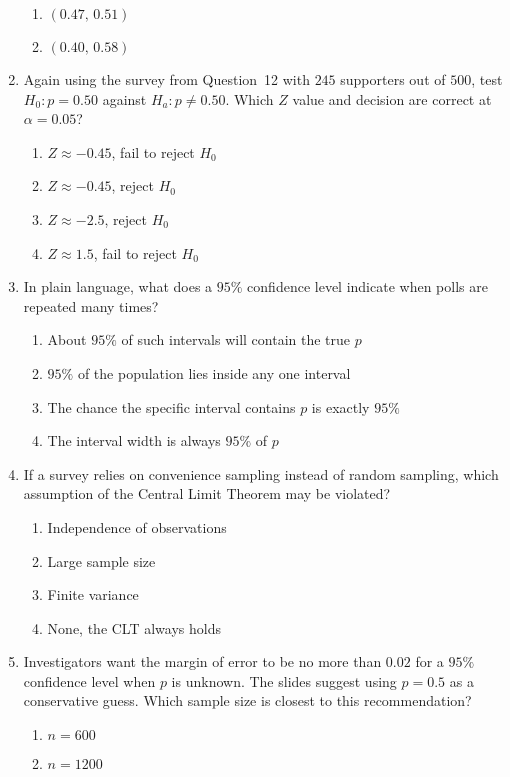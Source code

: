 \documentclass{article}
\begin{document}
\begin{enumerate}
\begin{enumerate}[label=(\Alph*)]
  \item $(0.47,\,0.51)$
  \item $(0.40,\,0.58)$
  \end{enumerate}
\item Again using the survey from Question~12 with $245$ supporters out of $500$, test $H_0:p=0.50$ against $H_a:p\ne0.50$. Which $Z$ value and decision are correct at $\alpha=0.05$?
  \begin{enumerate}[label=(\Alph*)]
  \item $Z\approx-0.45$, fail to reject $H_0$
  \item $Z\approx-0.45$, reject $H_0$
  \item $Z\approx-2.5$, reject $H_0$
  \item $Z\approx1.5$, fail to reject $H_0$
  \end{enumerate}
\item In plain language, what does a $95\%$ confidence level indicate when polls are repeated many times?
  \begin{enumerate}[label=(\Alph*)]
  \item About $95\%$ of such intervals will contain the true $p$
  \item $95\%$ of the population lies inside any one interval
  \item The chance the specific interval contains $p$ is exactly $95\%$
  \item The interval width is always $95\%$ of $p$
  \end{enumerate}
\item If a survey relies on convenience sampling instead of random sampling, which assumption of the Central Limit Theorem may be violated?
  \begin{enumerate}[label=(\Alph*)]
  \item Independence of observations
  \item Large sample size
  \item Finite variance
  \item None, the CLT always holds
  \end{enumerate}
\item Investigators want the margin of error to be no more than $0.02$ for a $95\%$ confidence level when $p$ is unknown. The slides suggest using $p=0.5$ as a conservative guess. Which sample size is closest to this recommendation?
  \begin{enumerate}[label=(\Alph*)]
  \item $n=600$
  \item $n=1200$

\end{enumerate}
\end{enumerate}
\end{document}
